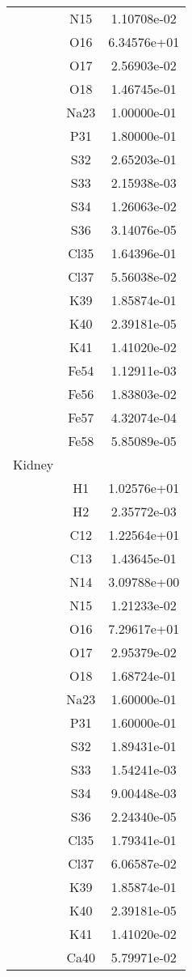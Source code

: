 \begin{centering}
\begin{longtable}{l c c}
& N15 & 1.10708e-02 \\ 
& O16 & 6.34576e+01 \\ 
& O17 & 2.56903e-02 \\ 
& O18 & 1.46745e-01 \\ 
& Na23 & 1.00000e-01 \\ 
& P31 & 1.80000e-01 \\ 
& S32 & 2.65203e-01 \\ 
& S33 & 2.15938e-03 \\ 
& S34 & 1.26063e-02 \\ 
& S36 & 3.14076e-05 \\ 
& Cl35 & 1.64396e-01 \\ 
& Cl37 & 5.56038e-02 \\ 
& K39 & 1.85874e-01 \\ 
& K40 & 2.39181e-05 \\ 
& K41 & 1.41020e-02 \\ 
& Fe54 & 1.12911e-03 \\ 
& Fe56 & 1.83803e-02 \\ 
& Fe57 & 4.32074e-04 \\ 
& Fe58 & 5.85089e-05 \\ 
\hline
Kidney & & \\
\hline
& H1 & 1.02576e+01 \\ 
& H2 & 2.35772e-03 \\ 
& C12 & 1.22564e+01 \\ 
& C13 & 1.43645e-01 \\ 
& N14 & 3.09788e+00 \\ 
& N15 & 1.21233e-02 \\ 
& O16 & 7.29617e+01 \\ 
& O17 & 2.95379e-02 \\ 
& O18 & 1.68724e-01 \\ 
& Na23 & 1.60000e-01 \\ 
& P31 & 1.60000e-01 \\ 
& S32 & 1.89431e-01 \\ 
& S33 & 1.54241e-03 \\ 
& S34 & 9.00448e-03 \\ 
& S36 & 2.24340e-05 \\ 
& Cl35 & 1.79341e-01 \\ 
& Cl37 & 6.06587e-02 \\ 
& K39 & 1.85874e-01 \\ 
& K40 & 2.39181e-05 \\ 
& K41 & 1.41020e-02 \\ 
& Ca40 & 5.79971e-02 \\ 

\end{longtable}
\end{centering}
